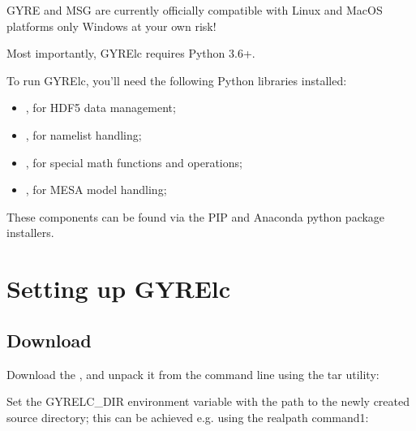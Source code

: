 \documentclass[letterpaper,10pt,english]{sphinxmanual}
\begin{document}
\sphinxAtStartPar
GYRE and MSG are currently officially compatible with Linux and MacOS platforms only\sphinxhyphen{} Windows at your own risk!

\sphinxAtStartPar
Most importantly, GYRE\sphinxhyphen{}lc requires Python 3.6+.

\sphinxAtStartPar
To run GYRE\sphinxhyphen{}lc, you’ll need the following Python libraries installed:
\begin{itemize}
\item {} 
\sphinxAtStartPar
{}, for HDF5 data management;

\item {} 
\sphinxAtStartPar
{}, for namelist handling;

\item {} 
\sphinxAtStartPar
{}, for special math functions and operations;

\item {} 
\sphinxAtStartPar
{}, for MESA model handling;

\end{itemize}

\sphinxAtStartPar
These components can be found via the PIP and Anaconda python package installers.


\section{Setting up GYRE\sphinxhyphen{}lc}
\label{\detokenize{ref-guide/installation:setting-up-gyre-lc}}

\subsection{Download}
\label{\detokenize{ref-guide/installation:download}}
\sphinxAtStartPar
Download the , and unpack it from the command line using the tar utility:

\sphinxAtStartPar
{}

\sphinxAtStartPar
Set the GYRELC\_DIR environment variable with the path to the newly created source directory; this can be achieved e.g. using the realpath command1:

\sphinxAtStartPar
{}
\end{document}
